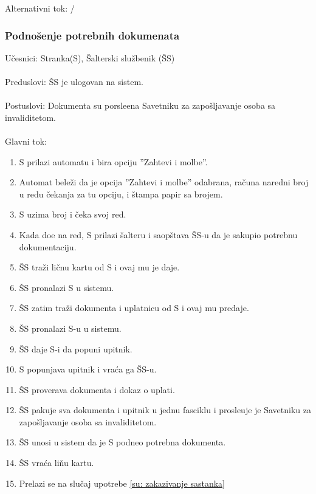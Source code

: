 \noindent Alternativni tok: /


\subsubsection{Podno\v senje potrebnih dokumenata}

\label{su: podnosenje dokumenata}

\noindent U\v cesnici: Stranka(S), \v Salterski slu\v zbenik (\v SS)
\\
\\ Preduslovi: \v SS je ulogovan na sistem.
\\
\\ Postuslovi: Dokumenta su porsle\dj ena Savetniku za zapo\v sljavanje osoba sa invaliditetom.
\\
\\ Glavni tok:
\begin{enumerate}
	\item S prilazi automatu i bira opciju ''Zahtevi i molbe''.
	\item Automat bele\v zi da je opcija ''Zahtevi i molbe'' odabrana, ra\v cuna naredni broj u redu \v cekanja za tu opciju, i \v stampa papir sa brojem.
	\item S uzima broj i \v ceka svoj red.
	\item Kada do\dj e na red, S prilazi \v salteru i saop\v stava \v SS-u da je sakupio potrebnu dokumentaciju.
	\item \v SS tra\v zi li\v cnu kartu od S i ovaj mu je daje.
	\item \v SS pronalazi S u sistemu.
	\item \v SS zatim tra\v zi dokumenta i uplatnicu od S i ovaj mu predaje.
	\item \v SS pronalazi S-u u sistemu.
	\item \v SS daje S-i da popuni upitnik.
	\item S popunjava upitnik i vra\' ca ga \v SS-u.
	\item \v SS proverava dokumenta i dokaz o uplati.
	\item \v SS pakuje sva dokumenta i upitnik u jednu fasciklu i prosle\dj uje je Savetniku za zapo\v sljavanje osoba sa invaliditetom.
	\item \v SS unosi u sistem da je S podneo potrebna dokumenta.
	\item \v SS vra\' ca li\v nu kartu.
	\item Prelazi se na slu\v caj upotrebe \ref{su: zakazivanje sastanka}
\end{enumerate}

